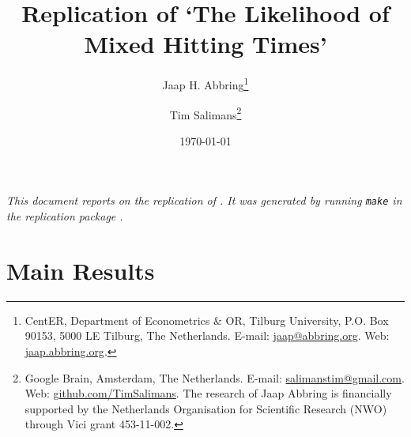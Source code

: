 \documentclass[fleqn,12pt]{article}
\begin{document}
\title{Replication of `The Likelihood of Mixed Hitting Times'}

\author{Jaap H. Abbring\thanks{%
CentER, Department of Econometrics \& OR, Tilburg University, P.O. Box
90153, 5000 LE Tilburg, The Netherlands. E-mail:
\href{mailto:jaap@abbring.org}{jaap@abbring.org}. Web: \href{http://jaap.abbring.org}{jaap.abbring.org}.}\and Tim Salimans\thanks{Google Brain, Amsterdam, The Netherlands. E-mail:
\href{mailto:salimanstim@gmail.com}{salimanstim@gmail.com}. Web: \href{http://github.com/TimSalimans}{github.com/TimSalimans}.
\newline The research of Jaap Abbring is financially supported by the Netherlands Organisation for Scientific Research (NWO) through Vici grant 453-11-002. 
}}

\date{\today}

\maketitle

{\em This document reports on the replication of \citet{jem21:abbringsalimans}. It was generated by running {\tt make} in the replication package \citep{zenodo21:abbringsalimans}.}

\section{Main Results}
\end{document}
